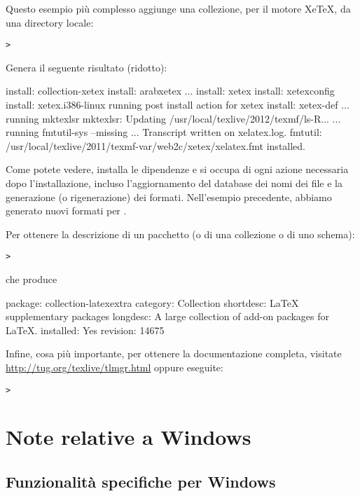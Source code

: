 \documentclass{article}
\begin{document}
Questo esempio più complesso aggiunge una collezione, per il motore
Xe\TeX, da una directory locale:

\begin{alltt}
> 
\end{alltt}
Genera il seguente risultato (ridotto):
\begin{fverbatim}
install: collection-xetex
install: arabxetex
...
install: xetex
install: xetexconfig
install: xetex.i386-linux
running post install action for xetex
install: xetex-def
...
running mktexlsr
mktexlsr: Updating /usr/local/texlive/2012/texmf/ls-R...
...
running fmtutil-sys --missing
...
Transcript written on xelatex.log.
fmtutil: /usr/local/texlive/2011/texmf-var/web2c/xetex/xelatex.fmt installed.
\end{fverbatim}

Come potete vedere,  installa le dipendenze e si occupa di ogni
azione necessaria dopo l'installazione, incluso l'aggiornamento del
database dei nomi dei file e la generazione (o rigenerazione) dei formati.
Nell'esempio precedente, abbiamo generato nuovi formati per \XeTeX.

Per ottenere la descrizione di un pacchetto (o di una collezione o di uno
schema):
\begin{alltt}
> 
\end{alltt}
che produce
\begin{fverbatim}
package:    collection-latexextra
category:   Collection
shortdesc:  LaTeX supplementary packages
longdesc:   A large collection of add-on packages for LaTeX.
installed:  Yes
revision:   14675
\end{fverbatim}

Infine, cosa più importante, per ottenere la documentazione completa,
visitate \url{http://tug.org/texlive/tlmgr.html} oppure eseguite:
\begin{alltt}
> 
\end{alltt}


\section{Note relative a Windows}
\label{sec:windows}


\subsection{Funzionalità specifiche per Windows}
\label{sec:winfeatures}
\end{document}
